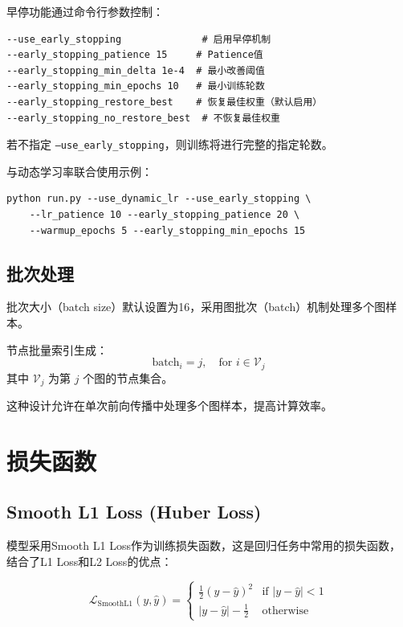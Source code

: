 \documentclass[UTF8, a4paper, 12pt]{article}
\begin{document}
早停功能通过命令行参数控制：

\begin{verbatim}
--use_early_stopping              # 启用早停机制
--early_stopping_patience 15     # Patience值
--early_stopping_min_delta 1e-4  # 最小改善阈值
--early_stopping_min_epochs 10   # 最小训练轮数
--early_stopping_restore_best    # 恢复最佳权重（默认启用）
--early_stopping_no_restore_best  # 不恢复最佳权重
\end{verbatim}

若不指定 \texttt{--use\_early\_stopping}，则训练将进行完整的指定轮数。

与动态学习率联合使用示例：

\begin{verbatim}
python run.py --use_dynamic_lr --use_early_stopping \
    --lr_patience 10 --early_stopping_patience 20 \
    --warmup_epochs 5 --early_stopping_min_epochs 15
\end{verbatim}

\subsection{批次处理}

批次大小（batch size）默认设置为16，采用图批次（batch）机制处理多个图样本。

节点批量索引生成：
\begin{equation}
\text{batch}_i = j, \quad \text{for } i \in \mathcal{V}_j
\end{equation}
其中 $\mathcal{V}_j$ 为第 $j$ 个图的节点集合。

这种设计允许在单次前向传播中处理多个图样本，提高计算效率。

\newpage

\section{损失函数}

\subsection{Smooth L1 Loss (Huber Loss)}

模型采用Smooth L1 Loss作为训练损失函数，这是回归任务中常用的损失函数，结合了L1 Loss和L2 Loss的优点：

\begin{equation}
\mathcal{L}_{\text{SmoothL1}}(y, \hat{y}) = \begin{cases}
\frac{1}{2} (y - \hat{y})^2 & \text{if } |y - \hat{y}| < 1 \\
|y - \hat{y}| - \frac{1}{2} & \text{otherwise}
\end{cases}
\end{equation}
\end{document}

